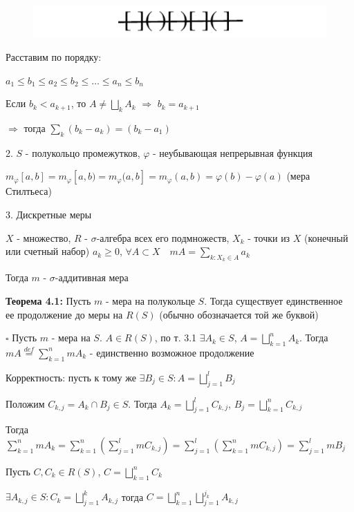 \documentclass[a4paper]{report}
\begin{document}
\begin{figure}
\includegraphics[width=\linewidth]{4}
\end{figure}

Расставим по порядку:

\noindent
$a_1\le b_1\le a_2\le b_2\le\ldots\le a_n\le b_n$

Если $b_k<a_{k+1}$, то $A\ne\bigsqcup\limits_k A_k$ $\Rightarrow$ $b_k=a_{k+1}$

$\Rightarrow$ тогда $\sum\limits_k
(b_k-a_k)=(b_k-a_1)$

2. $S$ - полукольцо промежутков, $\varphi$ - неубывающая непрерывная функция

$m_\varphi[a,b]=m_\varphi[a,b)=m_\varphi(a,b]=m_\varphi(a,b)=\varphi(b)-\varphi(a)$ (мера Стилтьеса)
\bigskip

3. Дискретные меры

$X$ - множество, $R$ - $\sigma$-алгебра всех его подмножеств, $X_k$ - точки из $X$ (конечный или счетный набор)
$a_k\ge0$, $\forall A\subset X\quad mA=\sum\limits_{k\colon X_k\in A}a_k$

Тогда $m$ - $\sigma$-аддитивная мера
\bigskip

\noindent\textbf{Теорема 4.1:} Пусть $m$ - мера на полукольце $S$. Тогда существует единственное ее продолжение до меры на
$R(S)$ (обычно обозначается той же буквой)

\noindent $\square$ Пусть $m$ - мера на $S$. $A\in R(S)$, по т. 3.1 $\exists A_k\in S$, $A=\bigsqcup_{k=1}^n A_k$.
Тогда $mA\stackrel{def}{=}\sum\limits_{k=1}^n mA_k$ - единственно возможное продолжение

Корректность: пусть к тому же $\exists B_j\in S\colon A=\bigsqcup\limits_{j=1}^l B_j$

Положим $C_{k,j}=A_k\cap B_j\in S$. Тогда $A_k=\bigsqcup\limits_{j=1}^l C_{k,j}$, $B_j=\bigsqcup\limits_{k=1}^n C_{k,j}$

Тогда $\sum\limits_{k=1}^n mA_k=\sum\limits_{k=1}^n\left(\sum\limits_{j=1}^l mC_{k,j}\right)=\sum\limits_{j=1}^l
\left(\sum\limits_{k=1}^n mC_{k,j}\right)=\sum\limits_{j=1}^l mB_j$

Пусть $C,C_k\in R(S)$, $C=\bigsqcup\limits_{k=1}^n C_k$

$\exists A_{k,j}\in S\colon C_k=\bigsqcup\limits_{j=1}^k A_{k,j}$ тогда $C=\bigsqcup\limits_{k=1}^n\bigsqcup\limits_{j=1}^{j_k}
A_{k,j}$
\end{document}
